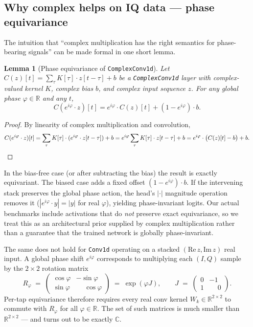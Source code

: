 \documentclass{article}
\newtheorem{lemma}{Lemma}
\newcommand{\code}[1]{\texttt{#1}}
\begin{document}
\subsection{Why complex helps on IQ data --- phase equivariance}
\label{sec:phase-equivariance}

The intuition that ``complex multiplication has the right semantics
for phase-bearing signals'' can be made formal in one short lemma.

\begin{lemma}[Phase equivariance of \code{ComplexConv1d}]
  \label{lem:phase-equivariance}
  Let $C(z)[t] = \sum_{\tau} K[\tau] \cdot z[t-\tau] + b$ be a
  \code{ComplexConv1d} layer with complex-valued kernel $K$, complex
  bias $b$, and complex input sequence $z$. For any global phase
  $\varphi \in \mathbb{R}$ and any $t$,
  \[
    C(e^{i\varphi} \cdot z)[t]
    = e^{i\varphi} \cdot C(z)[t] + (1 - e^{i\varphi}) \cdot b.
  \]
\end{lemma}

\begin{proof}
  By linearity of complex multiplication and convolution,
  \[
    C(e^{i\varphi} \cdot z)[t]
    = \sum_{\tau} K[\tau] \cdot (e^{i\varphi} \cdot z[t-\tau]) + b
    = e^{i\varphi} \sum_{\tau} K[\tau] \cdot z[t-\tau] + b
    = e^{i\varphi} \cdot \bigl(C(z)[t] - b\bigr) + b. \qedhere
  \]
\end{proof}

In the bias-free case (or after subtracting the bias) the result is
exactly equivariant. The biased case adds a fixed offset
$(1 - e^{i\varphi}) \cdot b$. If the intervening stack preserves the
global phase action, the head's $|\cdot|$ magnitude operation removes
it ($|e^{i\varphi} \cdot y| = |y|$ for real $\varphi$), yielding
phase-invariant logits. Our actual benchmarks include activations that
do \emph{not} preserve exact equivariance, so we treat this as an
architectural prior supplied by complex multiplication rather than a
guarantee that the trained network is globally phase-invariant.

The same does not hold for \code{Conv1d} operating on a stacked
$(\mathrm{Re}\,z, \mathrm{Im}\,z)$ real input. A global phase shift
$e^{i\varphi}$ corresponds to multiplying each $(I, Q)$ sample by the
$2 \times 2$ rotation matrix
\[
  R_\varphi \;=\; \begin{pmatrix}\cos\varphi & -\sin\varphi \\
  \sin\varphi & \phantom{-}\cos\varphi\end{pmatrix}
  \;=\; \exp(\varphi J),
  \qquad
  J \;=\; \begin{pmatrix}0 & -1 \\ 1 & \phantom{-}0\end{pmatrix}.
\]
Per-tap equivariance therefore requires every real conv kernel
$W_k\in\mathbb{R}^{2\times 2}$ to commute with $R_\varphi$ for all
$\varphi\in\mathbb{R}$. The set of such matrices is much smaller than
$\mathbb{R}^{2\times 2}$ --- and turns out to be exactly $\mathbb{C}$.
\end{document}
